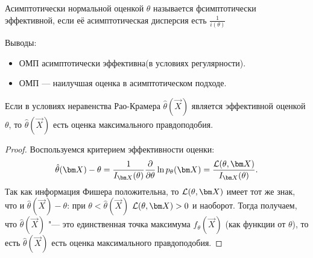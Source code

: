 \begin{definition}
    Асимптотически нормальной оценкой $\theta$ называется фсимптотически эффективной, если её асимптотическая дисперсия есть $\frac{1}{i(\theta)}$
\end{definition}

Выводы:
\begin{itemize}
    \item ОМП асимптотически эффективна(в условиях регулярности).
    \item ОМП --- наилучшая оценка в асимптотическом подходе.
\end{itemize}

\begin{theorem}
    Если в условиях неравенства Рао-Крамера $\hat{\theta}(\vec{X})$ является эффективной оценкой $\theta$, то $\hat{\theta}(\vec{X})$ есть оценка максимального правдоподобия.
\end{theorem}
\begin{proof}
    Воспользуемся критерием эффективности оценки:
    \[
        \hat{\theta}(\vec{X}) - \theta = \frac{1}{I_{\vec{X}}(\theta)}\frac{\partial}{\partial\theta}\ln p_{\theta}(\vec{X}) = \frac{\Ell(\theta, \vec{X})}{I_{\vec{X}}(\theta)}.
    \]
    Так как информация Фишера положительна, то $\Ell(\theta, \vec{X})$ имеет тот же знак, что и $\hat{\theta}(\vec{X}) - \theta$: при $\theta < \hat{\theta}(\vec{X})$ $\Ell(\theta, \vec{X}) > 0$ и наоборот. Тогда получаем, что $\hat{\theta}(\vec{X})$ "--- это единственная точка максимума $f_{\theta}(\vec{X})$ (как функции от $\theta$), то есть $\hat{\theta}(\vec{X})$ есть оценка максимального правдоподобия.
\end{proof}
